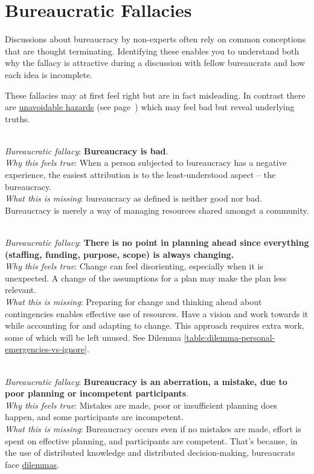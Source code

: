 \section{Bureaucratic Fallacies\label{sec:fallacies}}

Discussions about bureaucracy by non-experts often rely on common conceptions that are \gls{thought terminating}. Identifying these enables you to understand both why the fallacy is attractive during a discussion with fellow bureaucrats and how each idea is incomplete.

These fallacies may at first feel right but are in fact misleading. In contrast there are  \hyperref[sec:unavoidable-hazards]{unavoidable hazards} (see 
page~\pageref{sec:unavoidable-hazards})
which may feel bad but reveal underlying truths.

\ \\
\textit{Bureaucratic fallacy}: \textbf{Bureaucracy is bad}. \\
\textit{Why this feels true}: When a person subjected to bureaucracy has a negative experience, the easiest attribution is to the least-understood aspect -- the bureaucracy.\\
\textit{What this is missing}: \Gls{bureaucracy} as defined is neither good nor bad. Bureaucracy is merely a way of managing  resources shared amongst a community. 

\ \\
\textit{Bureaucratic fallacy}: 
\textbf{There is no point in planning ahead since everything (staffing, funding, purpose, scope) is always changing.}\\
\textit{Why this feels true}: Change can feel disorienting, especially when it is unexpected. A change of the assumptions for a plan may make the plan less relevant. \\
\textit{What this is missing}: Preparing for change and thinking ahead about contingencies enables effective use of resources. Have a vision and work towards it while accounting for and adapting to change. This approach requires extra work, some of which will be left unused. See Dilemma \ref{table:dilemma-personal-emergencies-vs-ignore}.


\ \\
\textit{Bureaucratic fallacy}: \textbf{Bureaucracy is an aberration, a mistake, due to poor planning or incompetent participants}. \\
\textit{Why this feels true}: Mistakes are made, poor or insufficient planning does happen, and some participants are incompetent.\\
\textit{What this is missing}: Bureaucracy occurs even if no mistakes are made, effort is spent on effective planning, and participants are competent. That's because, in the use of distributed knowledge and distributed decision-making, bureaucrats face \hyperref[sec:dilemma-trilemma]{dilemmas}.

